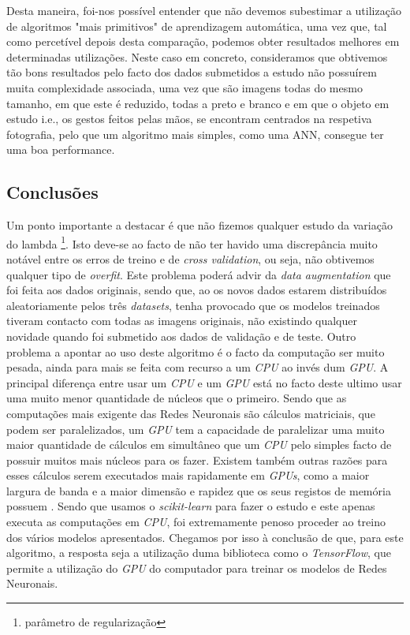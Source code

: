 Desta maneira, foi-nos possível entender que não devemos subestimar a utilização de algoritmos "mais primitivos" de aprendizagem automática, uma vez que, tal como percetível depois desta comparação, podemos obter resultados melhores em determinadas utilizações. Neste caso em concreto, consideramos que obtivemos tão bons resultados pelo facto dos dados submetidos a estudo não possuírem muita complexidade associada, uma vez que são imagens todas do mesmo tamanho, em que este é reduzido, todas a preto e branco e em que o objeto em estudo i.e., os gestos feitos pelas mãos, se encontram centrados na respetiva fotografia, pelo que um algoritmo mais simples, como uma ANN, consegue ter uma boa performance.


\subsection{Conclusões}
Um ponto importante a destacar é que não fizemos qualquer estudo da variação do lambda \footnote{parâmetro de regularização}. Isto deve-se ao facto de não ter havido uma discrepância muito notável entre os erros de treino e de \textit{cross validation}, ou seja, não obtivemos qualquer tipo de \textit{overfit}. Este problema poderá advir da \textit{data augmentation} que foi feita aos dados originais, sendo que, ao os novos dados estarem distribuídos aleatoriamente pelos três \textit{datasets}, tenha provocado que os modelos treinados tiveram contacto com todas as imagens originais, não existindo qualquer novidade quando foi submetido aos dados de validação e de teste.
Outro problema a apontar ao uso deste algoritmo é o facto da computação ser muito pesada, ainda para mais se feita com recurso a um \textit{CPU} ao invés dum \textit{GPU}. A principal diferença entre usar um \textit{CPU} e um \textit{GPU} está no facto deste ultimo usar   uma muito menor quantidade de núcleos que o primeiro. Sendo que as computações mais exigente das Redes Neuronais são cálculos matriciais, que podem ser paralelizados, um \textit{GPU} tem a capacidade de paralelizar uma muito maior quantidade de cálculos em simultâneo que um \textit{CPU} pelo simples facto de possuir muitos mais núcleos para os fazer. Existem também outras razões para esses cálculos serem executados mais rapidamente em \textit{GPUs}, como a maior largura de banda e a maior dimensão e rapidez que os seus registos de memória possuem \cite{cpu_vs_gpu}. Sendo que usamos o \textit{scikit-learn} para fazer o estudo e este apenas executa as computações em \textit{CPU}, foi extremamente penoso proceder ao treino dos vários modelos apresentados. Chegamos por isso à conclusão de que, para este algoritmo, a resposta seja a utilização duma biblioteca como o \textit{TensorFlow}, que permite a utilização do \textit{GPU} do computador para treinar os modelos de Redes Neuronais.
